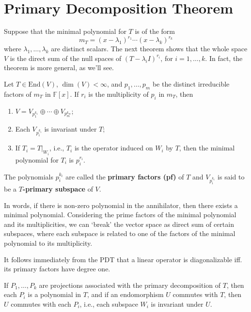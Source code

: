 \section{Primary Decomposition Theorem}\label{sec:pdt}

Suppose that the minimal polynomial for $T$ is of the form
\[
  m_T = (x - \lambda_1)^{r_1} \cdots (x - \lambda_k)^{r_k}
\]
where $\lambda_1, \ldots, \lambda_k$ are distinct scalars. The next theorem shows that the whole space $V$ is the direct sum of the null spaces of $(T - \lambda_i I)^{r_i}$, for $i = 1, \ldots, k$. In fact, the theorem is more general, as we'll see.

\begin{theorem}\label{thm:pdt}
  Let $T \in \text{End}(V)$, $\dim(V) < \infty$, and $p_1, \ldots, p_m$ be the distinct irreducible factors of $m_T$ in $\mathbb{F}[x]$. If $r_i$ is the multiplicity of $p_i$ in $m_T$, then
  \begin{enumerate}
    \item $V = V_{p_1^{k_1}} \oplus \cdots \oplus V_{p_m^{k_m}}$;
    \item Each $V_{p_i^{k_i}}$ is invariant under $T$;
    \item If $T_i = T|_{W_i}$, i.e., $T_i$ is the operator induced on $W_i$ by $T$, then the minimal polynomial for $T_i$ is $p_i^{r_i}$.
  \end{enumerate}
	The polynomials $p_i^{k_i}$ are called the \textbf{primary factors (pf)} of $T$ and $V_{p_i^{k_i}}$ is said to be a \textbf{$T$-primary subspace} of $V$.
\end{theorem}

In words, if there is non-zero polynomial in the annihilator, then there exists a minimal polynomial. Considering the prime factors of the minimal polynomial and its multiplicities, we can `break' the vector space as direct sum of certain subspaces, where each subspace is related to one of the factors of the minimal polynomial to its multiplicity.

It follows immediately from the PDT that a linear operator is diagonalizable iff. its primary factors have degree one.

\begin{corollary}
  If $P_1, \ldots, P_k$ are projections associated with the primary decomposition of $T$, then each $P_i$ is a polynomial in $T$, and if an endomorphism $U$ commutes with $T$, then $U$ commutes with each $P_i$, i.e., each subspace $W_i$ is invariant under $U$.
\end{corollary}

